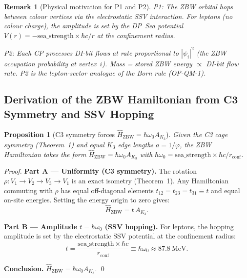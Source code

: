 \documentclass[11pt]{article}
\newtheorem{remark}{Remark}[section]
\newtheorem{proposition}[theorem]{Proposition}
\newcommand{\ZBW}{\mathrm{ZBW}}
\begin{document}
\begin{remark}[Physical motivation for P1 and P2]
P1: The ZBW orbital hops between colour vertices via the electrostatic
SSV interaction.  For leptons (no colour charge), the amplitude is set
by the DP~Sea potential $V(r) = -\mathrm{sea\_strength}\times\hbar c/r$
at the confinement radius.

P2: Each CP processes DI-bit flows at rate proportional to $|\psi_i|^2$
(the ZBW occupation probability at vertex~$i$).  Mass = stored ZBW energy
$\propto$ DI-bit flow rate.  P2 is the lepton-sector analogue of the
Born rule (OP-QM-1).
\end{remark}

\subsection*{Derivation of the ZBW Hamiltonian from C3 Symmetry and SSV Hopping}
\label{prop:P1_derivation}

\begin{proposition}[C3 symmetry forces $\hat{H}_\ZBW = \hbar\omega_0 A_{K_3}$]
\label{prop:H_derived}
Given the C3 cage symmetry (Theorem~1) and equal $K_3$ edge lengths
$a = 1/\varphi$, the ZBW Hamiltonian takes the form
$\hat{H}_\ZBW = \hbar\omega_0 A_{K_3}$ with
$\hbar\omega_0 = \mathrm{sea\_strength}\times\hbar c/r_{\mathrm{conf}}$.
\end{proposition}

\begin{proof}
\textbf{Part A --- Uniformity (C3 symmetry).}
The rotation $\rho: V_1\!\to\!V_2\!\to\!V_3\!\to\!V_1$ is an exact isometry
(Theorem~1).  Any Hamiltonian commuting with $\rho$ has equal off-diagonal
elements $t_{12} = t_{23} = t_{31} \equiv t$ and equal on-site energies.
Setting the energy origin to zero gives:
\begin{equation}
\hat{H}_\ZBW = t\, A_{K_3}.
\end{equation}

\textbf{Part B --- Amplitude $t = \hbar\omega_0$ (SSV hopping).}
For leptons, the hopping amplitude is set by the electrostatic SSV
potential at the confinement radius:
\begin{equation}
t = \frac{\mathrm{sea\_strength}\times\hbar c}{r_{\mathrm{conf}}}
\equiv \hbar\omega_0 \approx 87.8~\text{MeV}.
\label{eq:hop_amp}
\end{equation}

\textbf{Conclusion.}
$\hat{H}_\ZBW = \hbar\omega_0 A_{K_3}$. \qed
\end{proof}
\end{document}
